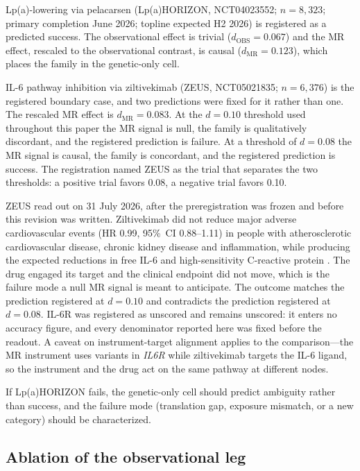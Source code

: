 \documentclass[11pt]{article}
\begin{document}
Lp(a)-lowering via pelacarsen (Lp(a)HORIZON, NCT04023552; $n = 8{,}323$; primary completion June 2026; topline expected H2 2026) is registered as a predicted success. The observational effect is trivial ($d_{\text{OBS}} = 0.067$) and the MR effect, rescaled to the observational contrast, is causal ($d_{\text{MR}} = 0.123$), which places the family in the genetic-only cell.

IL-6 pathway inhibition via ziltivekimab (ZEUS, NCT05021835; $n = 6{,}376$) is the registered boundary case, and two predictions were fixed for it rather than one. The rescaled MR effect is $d_{\text{MR}} = 0.083$. At the $d = 0.10$ threshold used throughout this paper the MR signal is null, the family is qualitatively discordant, and the registered prediction is failure. At a threshold of $d = 0.08$ the MR signal is causal, the family is concordant, and the registered prediction is success. The registration named ZEUS as the trial that separates the two thresholds: a positive trial favors 0.08, a negative trial favors 0.10.

ZEUS read out on 31 July 2026, after the preregistration was frozen and before this revision was written. Ziltivekimab did not reduce major adverse cardiovascular events (HR 0.99, 95\%~CI 0.88--1.11) in people with atherosclerotic cardiovascular disease, chronic kidney disease and inflammation, while producing the expected reductions in free IL-6 and high-sensitivity C-reactive protein \cite{novonordisk2026zeus}. The drug engaged its target and the clinical endpoint did not move, which is the failure mode a null MR signal is meant to anticipate. The outcome matches the prediction registered at $d = 0.10$ and contradicts the prediction registered at $d = 0.08$. IL-6R was registered as unscored and remains unscored: it enters no accuracy figure, and every denominator reported here was fixed before the readout. A caveat on instrument-target alignment applies to the comparison---the MR instrument uses variants in \emph{IL6R} while ziltivekimab targets the IL-6 ligand, so the instrument and the drug act on the same pathway at different nodes.

If Lp(a)HORIZON fails, the genetic-only cell should predict ambiguity rather than success, and the failure mode (translation gap, exposure mismatch, or a new category) should be characterized.

\subsection{Ablation of the observational leg}
\label{sec:ablation}
\end{document}
